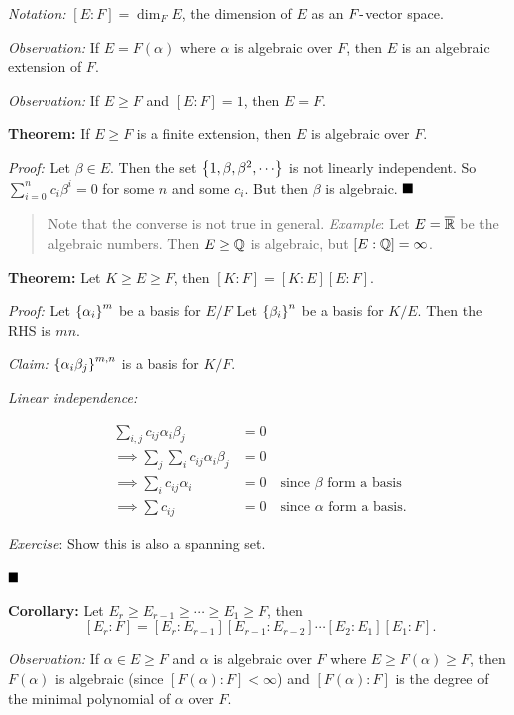 \emph{Notation:} \([E: F] = \dim_F E\), the dimension of \(E\) as an
\(F{\hbox{-}}\)vector space.

\emph{Observation:} If \(E = F(\alpha)\) where \(\alpha\) is algebraic
over \(F\), then \(E\) is an algebraic extension of \(F\).

\emph{Observation:} If \(E\geq F\) and \([E: F] = 1\), then \(E=F\).

\textbf{Theorem:} If \(E \geq F\) is a finite extension, then \(E\) is
algebraic over \(F\).

\emph{Proof:} Let \(\beta \in E\). Then the set
\(\left\{{1, \beta, \beta^2, \cdots}\right\}\) is not linearly independent. So
\(\sum_{i=0}^n c_i \beta^i = 0\) for some \(n\) and some \(c_i\). But
then \(\beta\) is algebraic. \(\qed\)

\begin{quote}
Note that the converse is not true in general. \emph{Example}: Let
\(E = \overline {{\mathbb{R}}}\) be the algebraic numbers. Then \(E \geq {\mathbb{Q}}\) is
algebraic, but \([E : {\mathbb{Q}}] = \infty\).
\end{quote}

\textbf{Theorem:} Let \(K \geq E \geq F\), then
\([K: F] = [K: E] [E: F]\).

\emph{Proof:} Let \(\left\{{\alpha_i}\right\}^m\) be a basis for \(E/F\) Let
\(\left\{{\beta_i}\right\}^n\) be a basis for \(K / E\). Then the RHS is \(mn\).

\emph{Claim:} \(\left\{{\alpha_i \beta_j}\right\}^{m, n}\) is a basis for
\(K/ F\).

\emph{Linear independence:}

\begin{align*}
\sum_{i, j} c_{ij} \alpha _i \beta_j &= 0 \\
\implies \sum_j \sum_i c_{ij} \alpha_i \beta_j &= 0 \\
\implies \sum_i c_{ij} \alpha_i &= 0 \quad \text{since $\beta$ form a basis} \\
\implies \sum c_{ij} &= 0 \quad \text{since $\alpha$ form a basis}
.\end{align*}

\emph{Exercise}: Show this is also a spanning set.

\(\qed\)

\textbf{Corollary:} Let
\(E_r \geq E_{r-1} \geq \cdots \geq E_1 \geq F\), then \[
[E_r: F]= [E_r: E_{r-1}][E_{r-1}:E_{r-2}] \cdots [E_2: E_1][E_1 : F]
.\]

\emph{Observation:} If \(\alpha \in E \geq F\) and \(\alpha\) is
algebraic over \(F\) where \(E \geq F(\alpha) \geq F\), then
\(F(\alpha)\) is algebraic (since \([F(\alpha): F] < \infty\)) and
\([F(\alpha): F]\) is the degree of the minimal polynomial of \(\alpha\)
over \(F\).

